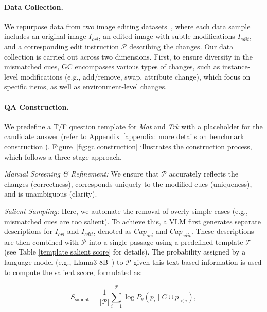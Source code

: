 \paragraph{Data Collection.} 
We repurpose data from two image editing datasets~\citep{wei2024omniedit,ku2023imagenhub}, where each data sample includes an original image $I_{ori}$, an edited image with subtle modifications $I_{edit}$, and a corresponding edit instruction $\mathcal{P}$ describing the changes. Our data collection is carried out across two dimensions. First, to ensure diversity in the mismatched cues, GC encompasses various types of changes, such as instance-level modifications (e.g., add/remove, swap, attribute change), which focus on specific items, as well as environment-level changes.

\paragraph{QA Construction.}
We predefine a T/F question template for \textit{Mat} and \textit{Trk} with a placeholder for the candidate answer (refer to Appendix~\ref{appendix: more details on benchmark construction}). Figure~\ref{fig:gc construction} illustrates the construction process, which follows a three-stage approach. 

\textit{Manual Screening \& Refinement:} We ensure that $\mathcal{P}$ accurately reflects the changes (correctness), corresponds uniquely to the modified cues (uniqueness), and is unambiguous (clarity).


\textit{Salient Sampling:} Here, we automate the removal of overly simple cases (e.g., mismatched cues are too salient). To achieve this, a VLM first generates separate descriptions for \( I_{ori} \) and \( I_{edit} \), denoted as \( Cap_{ori} \) and \( Cap_{edit} \). These descriptions are then combined with \( \mathcal{P} \) into a single passage using a predefined template \(\mathcal{T}\) (see Table \ref{template salient score} for details). The probability assigned by a language model (e.g., Llama3-8B~\citep{dubey2024llama}) to \( \mathcal{P} \) given this text-based information is used to compute the salient score, formulated as:

\vspace{-13pt}
\begin{equation}
S_{\text{salient}} = \frac{1}{|\mathcal{P}|} \sum_{i=1}^{|\mathcal{P}|} \log P_{\theta}(p_i \mid C \cup p_{<i}),
\end{equation}

